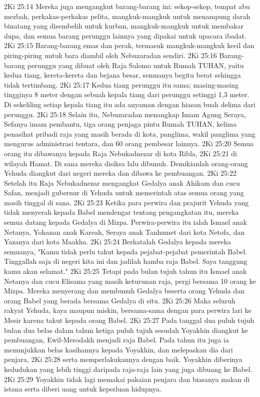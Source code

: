 2Ki 25:14  Mereka juga mengangkut barang-barang ini: sekop-sekop, tempat abu mezbah, perkakas-perkakas pelita, mangkuk-mangkuk untuk menampung darah binatang yang disembelih untuk kurban, mangkuk-mangkuk untuk membakar dupa, dan semua barang perunggu lainnya yang dipakai untuk upacara ibadat.
2Ki 25:15  Barang-barang emas dan perak, termasuk mangkuk-mangkuk kecil dan piring-piring untuk bara diambil oleh Nebuzaradan sendiri.
2Ki 25:16  Barang-barang perunggu yang dibuat oleh Raja Salomo untuk Rumah TUHAN, yaitu kedua tiang, kereta-kereta dan bejana besar, semuanya begitu berat sehingga tidak tertimbang.
2Ki 25:17  Kedua tiang perunggu itu sama; masing-masing tingginya 8 meter dengan sebuah kepala tiang dari perunggu setinggi 1,3 meter. Di sekeliling setiap kepala tiang itu ada anyaman dengan hiasan buah delima dari perunggu.
2Ki 25:18  Selain itu, Nebuzaradan menangkap Imam Agung Seraya, Sefanya imam pembantu, tiga orang penjaga pintu Rumah TUHAN, kelima penasihat pribadi raja yang masih berada di kota, panglima, wakil panglima yang mengurus administrasi tentara, dan 60 orang pembesar lainnya.
2Ki 25:20  Semua orang itu dibawanya kepada Raja Nebukadnezar di kota Ribla,
2Ki 25:21  di wilayah Hamat. Di sana mereka disiksa lalu dibunuh. Demikianlah orang-orang Yehuda diangkut dari negeri mereka dan dibawa ke pembuangan.
2Ki 25:22  Setelah itu Raja Nebukadnezar mengangkat Gedalya anak Ahikam dan cucu Safan, menjadi gubernur di Yehuda untuk memerintah atas semua orang yang masih tinggal di sana.
2Ki 25:23  Ketika para perwira dan prajurit Yehuda yang tidak menyerah kepada Babel mendengar tentang pengangkatan itu, mereka semua datang kepada Gedalya di Mizpa. Perwira-perwira itu ialah Ismael anak Netanya, Yohanan anak Kareah, Seraya anak Tanhumet dari kota Netofa, dan Yazanya dari kota Maakha.
2Ki 25:24  Berkatalah Gedalya kepada mereka semuanya, "Kamu tidak perlu takut kepada pejabat-pejabat pemerintah Babel. Tinggallah saja di negeri kita ini dan jadilah hamba raja Babel. Saya tanggung kamu akan selamat."
2Ki 25:25  Tetapi pada bulan tujuh tahun itu Ismael anak Netanya dan cucu Elisama yang masih keturunan raja, pergi bersama 10 orang ke Mizpa. Mereka menyerang dan membunuh Gedalya beserta orang Yehuda dan orang Babel yang berada bersama Gedalya di situ.
2Ki 25:26  Maka seluruh rakyat Yehuda, kaya maupun miskin, bersama-sama dengan para perwira lari ke Mesir karena takut kepada orang Babel.
2Ki 25:27  Pada tanggal dua puluh tujuh bulan dua belas dalam tahun ketiga puluh tujuh sesudah Yoyakhin diangkut ke pembuangan, Ewil-Merodakh menjadi raja Babel. Pada tahun itu juga ia menunjukkan belas kasihannya kepada Yoyakhin, dan melepaskan dia dari penjara,
2Ki 25:28  serta memperlakukannya dengan baik. Yoyakhin diberinya kedudukan yang lebih tinggi daripada raja-raja lain yang juga dibuang ke Babel.
2Ki 25:29  Yoyakhin tidak lagi memakai pakaian penjara dan biasanya makan di istana serta diberi uang untuk keperluan hidupnya.


